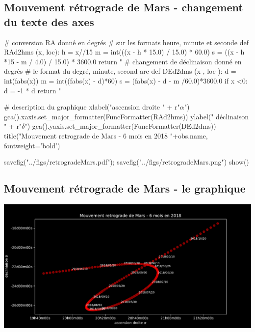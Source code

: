 \documentclass[%
oneside,                 %
final,                   %
10pt]{article}
\begin{document}
\vspace{6mm}



\subsection{Mouvement rétrograde de Mars - changement du texte des axes}
\bpycod
# conversion RA donné en degrés
# sur les formats heure, minute et seconde
def RAd2hms (x, loc):
    h = x//15
    m = int(((x - h * 15.0) / 15.0) * 60.0)
    s = ((x - h *15 - m / 4.0) / 15.0) * 3600.0
    return "%
# changement de déclinaison donné en degrés
# le format du degré, minute, second arc
def DEd2dms (x , loc ):
    d = int(fabs(x))
    m = int((fabs(x) - d)*60)
    s = (fabs(x) - d - m /60.0)*3600.0
    if x <0: d = -1 * d
    return " %

# description du graphique
xlabel("ascension droite " + r"$\alpha$")
gca().xaxis.set_major_formatter(FuncFormatter(RAd2hms))
ylabel(" déclinaison " + r"$\delta$")
gca().yaxis.set_major_formatter(FuncFormatter(DEd2dms))
title("Mouvement retrograde de Mars - 6 mois en 2018 \n"+obs.name, fontweight='bold')

savefig("../figs/retrogradeMars.pdf"); savefig("../figs/retrogradeMars.png")
show()
\epycod

\subsection{Mouvement rétrograde de Mars - le graphique}


\vspace{6mm}

\centerline{\includegraphics[width=0.9\linewidth]{figs/retrogradeMars.pdf}}

\vspace{6mm}
\end{document}
